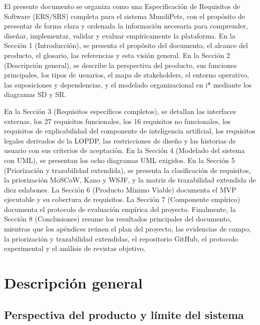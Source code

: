 \documentclass[journal,onecolumn]{IEEEtran}
\begin{document}
	El presente documento se organiza como una Especificación de Requisitos de
	Software (ERS/SRS) completa para el sistema MundiPets, con el propósito de
	presentar de forma clara y ordenada la información necesaria para comprender,
	diseñar, implementar, validar y evaluar empíricamente la plataforma. En la
	Sección 1 (Introducción), se presenta el propósito del documento, el alcance
	del producto, el glosario, las referencias y esta visión general. En la
	Sección 2 (Descripción general), se describe la perspectiva del producto, sus
	funciones principales, los tipos de usuarios, el mapa de stakeholders, el
	entorno operativo, las suposiciones y dependencias, y el modelado
	organizacional en i* mediante los diagramas SD y SR.
	
	En la Sección 3 (Requisitos específicos completos), se detallan las interfaces
	externas, los 27 requisitos funcionales, los 16 requisitos no funcionales, los
	requisitos de explicabilidad del componente de inteligencia artificial, los
	requisitos legales derivados de la LOPDP, las restricciones de diseño y las
	historias de usuario con sus criterios de aceptación. En la Sección 4
	(Modelado del sistema con UML), se presentan los ocho diagramas UML exigidos.
	En la Sección 5 (Priorización y trazabilidad extendida), se presenta la
	clasificación de requisitos, la priorización MoSCoW, Kano y WSJF, y la matriz
	de trazabilidad extendida de diez eslabones. La Sección 6 (Producto Mínimo
	Viable) documenta el MVP ejecutable y su cobertura de requisitos. La Sección 7
	(Componente empírico) documenta el protocolo de evaluación empírica del
	proyecto. Finalmente, la Sección 8 (Conclusiones) resume los resultados
	principales del documento, mientras que los apéndices reúnen el plan del
	proyecto, las evidencias de campo, la priorización y trazabilidad extendidas,
	el repositorio GitHub, el protocolo experimental y el análisis de revistas
	objetivo.
	
	\section{Descripción general}
	
	\subsection{Perspectiva del producto y límite del sistema}
	\label{sec:perspectiva}
	
\end{document}
